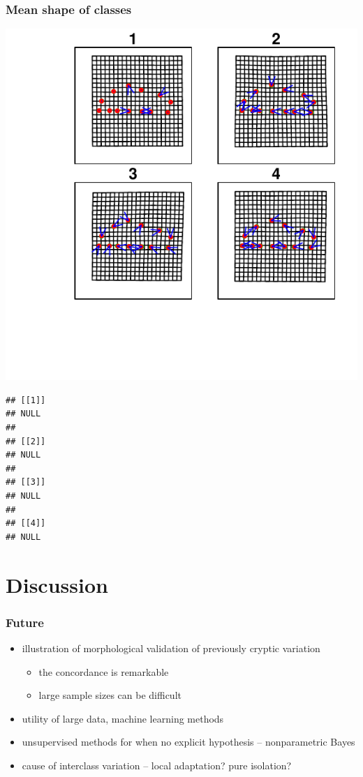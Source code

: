 \documentclass{beamer}\usepackage{graphicx, color}
\makeatletter
\def\maxwidth{ %
  \ifdim\Gin@nat@width>\linewidth
    \linewidth
  \else
    \Gin@nat@width
  \fi
}
\newenvironment{kframe}{%
 \def\at@end@of@kframe{}%
 \ifinner\ifhmode%
  \def\at@end@of@kframe{\end{minipage}}%
  \begin{minipage}{\columnwidth}%
 \fi\fi%
 \def\FrameCommand##1{\hskip\@totalleftmargin \hskip-\fboxsep
 \colorbox{shadecolor}{##1}\hskip-\fboxsep
     \hskip-\linewidth \hskip-\@totalleftmargin \hskip\columnwidth}%
 \MakeFramed {\advance\hsize-\width
   \@totalleftmargin\z@ \linewidth\hsize
   \@setminipage}}%
 {\par\unskip\endMakeFramed%
 \at@end@of@kframe}
\newenvironment{knitrout}{}{} %
\makeatother
\begin{document}
\begin{frame}[fragile]
  \frametitle{Mean shape of classes}

\begin{knitrout}
\color{fgcolor}
\includegraphics[width=\maxwidth]{figure/unnamed-chunk-6} 
\begin{kframe}\begin{verbatim}
## [[1]]
## NULL
## 
## [[2]]
## NULL
## 
## [[3]]
## NULL
## 
## [[4]]
## NULL
\end{verbatim}
\end{kframe}
\end{knitrout}


\end{frame}

\section{Discussion}
\begin{frame}
  \frametitle{Future}

  \begin{itemize}
    \item illustration of morphological validation of previously cryptic variation
      \begin{itemize}
        \item the concordance is remarkable
        \item large sample sizes can be difficult
      \end{itemize}
    \item utility of large data, machine learning methods 
    \item unsupervised methods for when no explicit hypothesis -- nonparametric Bayes
    \item cause of interclass variation -- local adaptation? pure isolation?
  \end{itemize}

\end{frame}
\end{document}
